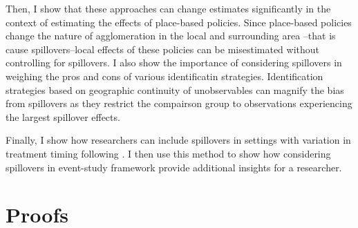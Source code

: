 \documentclass[11pt]{article}
\begin{document}
Then, I show that these approaches can change estimates significantly in the context of estimating the effects of place-based policies. Since place-based policies change the nature of agglomeration in the local and surrounding area --that is cause spillovers--local effects of these policies can be misestimated without controlling for spillovers. I also show the importance of considering spillovers in weighing the pros and cons of various identificatin strategies. Identification strategies based on geographic continuity of unobservables can magnify the bias from spillovers as they restrict the compairson group to observations experiencing the largest spillover effects.

Finally, I show how researchers can include spillovers in settings with variation in treatment timing following \citet{Callaway_SantAnna_2020}. I then use this method to show how considering spillovers in event-study framework provide additional insights for a researcher.








\newpage 


\newpage \appendix 
\renewcommand{\thetable}{\Alph{section}.\arabic{table}}
\renewcommand{\thefigure}{\Alph{section}.\arabic{figure}}

\section{Proofs}
\label{sec:proofs}
\end{document}

